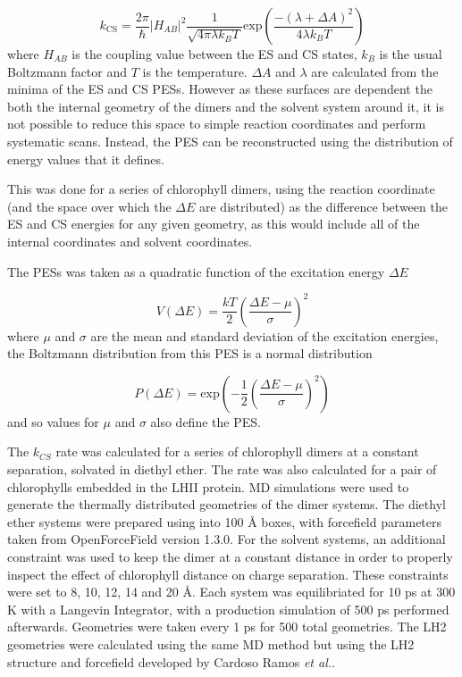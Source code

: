 \begin{equation}
    k_{\text{CS}} = \frac{2\pi}{\hbar} \left\lvert H_{AB} \right\rvert^2 \frac{1}{\sqrt{4 \pi \lambda k_B T}}\text{exp}\left(\frac{-\left(\lambda + \Delta A\right)^2}{4 \lambda k_B T}\right)
\end{equation}
%
where $H_{AB}$ is the coupling value between the ES and CS states, $k_B$ is the 
usual Boltzmann factor and $T$ is the temperature. $\Delta A$ and $\lambda$ are
calculated from the minima of the ES and CS PESs. However as these surfaces are 
dependent the both the internal geometry of the dimers and the solvent system around
it, it is not possible to reduce this space to simple reaction coordinates and 
perform systematic scans. Instead, the PES can be reconstructed using the distribution 
of energy values that it defines. 

This was done for a series of chlorophyll dimers, using the reaction coordinate 
(and the space over which the $\Delta E$ are  distributed) as the difference between
the ES and CS energies for any given geometry, as this would include all of the
internal coordinates and solvent coordinates.

The PESs was taken as a quadratic function of the excitation energy $\Delta E$

\begin{equation}
    V\left(\Delta E\right) = \frac{kT}{2} \left( \frac{\Delta E - \mu}{\sigma}\right)^2
\end{equation}
%
where $\mu$ and $\sigma$ are the mean and standard deviation of the excitation energies,
the Boltzmann distribution from this PES is a normal distribution

\begin{equation}
    P\left(\Delta E\right) = \text{exp} \left(-\frac{1}{2}\left(\frac{\Delta E - \mu}{\sigma}\right)^2\right)
\end{equation}
%
and so values for $\mu$ and $\sigma$ also define the PES. 

The $k_{CS}$ rate was calculated for a series of chlorophyll dimers at a constant
separation, solvated in diethyl ether. The rate was also calculated for a pair of
chlorophylls embedded in the LHII protein. MD simulations were used to generate 
the thermally distributed geometries of the dimer systems. The diethyl ether systems
were prepared using  into 100 \AA{} boxes, with forcefield parameters taken
from OpenForceField version 1.3.0. For the solvent systems, an additional constraint
was used to keep the dimer at a constant distance in order to properly inspect the 
effect of chlorophyll distance on charge separation. These constraints were set to
8, 10, 12, 14 and 20 \AA{}. Each system was equilibriated for 10 ps at 300 K with a
Langevin Integrator, with a production simulation of 500 ps performed afterwards. 
Geometries were taken every 1 ps for 500 total geometries. The LH2 geometries were
calculated using the same MD method but using the LH2 structure and forcefield developed
by Cardoso Ramos \emph{et al.}.

